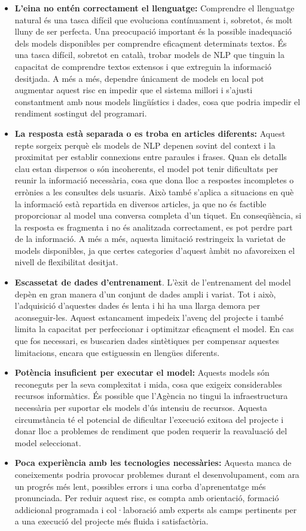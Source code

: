 \begin{itemize}
    \item \textbf{L'eina no entén correctament el llenguatge:} Comprendre el llenguatge natural és una tasca difícil que evoluciona contínuament i, sobretot, és molt lluny de ser perfecta. Una preocupació important és la possible inadequació dels models disponibles per comprendre eficaçment determinats textos. És una tasca difícil, sobretot en català, trobar models de NLP que tinguin la capacitat de comprendre textos extensos i que extreguin la informació desitjada. A més a més, dependre únicament de models en local pot augmentar aquest risc en impedir que el sistema millori i s'ajusti constantment amb nous models lingüístics i dades, cosa que podria impedir el rendiment sostingut del programari.
    \item \textbf{La resposta està separada o es troba en articles diferents:} Aquest repte sorgeix perquè els models de NLP depenen sovint del context i la proximitat per establir connexions entre paraules i frases. Quan els detalls clau estan dispersos o són incoherents, el model pot tenir dificultats per reunir la informació necessària, cosa que dona lloc a respostes incompletes o errònies a les consultes dels usuaris. Això també s'aplica a situacions en què la informació està repartida en diversos articles, ja que no és factible proporcionar al model una conversa completa d'un tiquet. En conseqüència, si la resposta es fragmenta i no és analitzada correctament, es pot perdre part de la informació. A més a més, aquesta limitació restringeix la varietat de models disponibles, ja que certes categories d'aquest àmbit no afavoreixen el nivell de flexibilitat desitjat.
    \item \textbf{Escassetat de dades d'entrenament}. L'èxit de l'entrenament del model depèn en gran manera d'un conjunt de dades ampli i variat. Tot i això, l'adquisició d'aquestes dades és lenta i hi ha una llarga demora per aconseguir-les. Aquest estancament impedeix l'avenç del projecte i també limita la capacitat per perfeccionar i optimitzar eficaçment el model. En cas que fos necessari, es buscarien dades sintètiques per compensar aquestes limitacions, encara que estiguessin en llengües diferents.
    \item \textbf{Potència insuficient per executar el model:} Aquests models són reconeguts per la seva complexitat i mida, cosa que exigeix considerables recursos informàtics. És possible que l'Agència no tingui la infraestructura necessària per suportar els models d'ús intensiu de recursos. Aquesta circumstància té el potencial de dificultar l'execució exitosa del projecte i donar lloc a problemes de rendiment que poden requerir la reavaluació del model seleccionat.
    \item \textbf{Poca experiència amb les tecnologies necessàries:} Aquesta manca de coneixements podria provocar problemes durant el desenvolupament, com ara un progrés més lent, possibles errors i una corba d'aprenentatge més pronunciada. Per reduir aquest risc, es compta amb orientació, formació addicional programada i col·laboració amb experts als camps pertinents per a una execució del projecte més fluida i satisfactòria.
\end{itemize}
